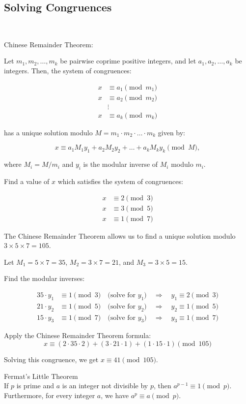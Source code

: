 \subsection{Solving Congruences}$ $\\
\begin{thm}{Chinese Remainder Theorem:}


Let $m_1, m_2, \ldots, m_k$ be pairwise coprime positive integers, and let $a_1, a_2, \ldots, a_k$ be integers. Then, the system of congruences:


\begin{align*}
x &\equiv a_1 \pmod{m_1} \\
x &\equiv a_2 \pmod{m_2} \\
& \vdots \\
x &\equiv a_k \pmod{m_k}
\end{align*}


has a unique solution modulo $M = m_1 \cdot m_2 \cdot \ldots \cdot m_k$ given by:

\[
x \equiv a_1 M_1 y_1 + a_2 M_2 y_2 + \ldots + a_k M_k y_k \pmod{M},
\]

where $M_i = M/m_i$ and $y_i$ is the modular inverse of $M_i$ modulo $m_i$.

\end{thm}
\begin{exmp}
Find a value of $x$ which satisfies the system of congruences:

\begin{align*}
x &\equiv 2 \pmod{3} \\
x &\equiv 3 \pmod{5} \\
x &\equiv 1 \pmod{7}
\end{align*}


The Chinese Remainder Theorem allows us to find a unique solution modulo \(3 \times 5 \times 7 = 105\).

Let \(M_1 = 5 \times 7 = 35\), \(M_2 = 3 \times 7 = 21\), and \(M_3 = 3 \times 5 = 15\).

Find the modular inverses:

\begin{align*}
35 \cdot y_1 &\equiv 1 \pmod{3} \quad \text{(solve for \(y_1\))} \quad \Rightarrow \quad y_1 \equiv 2 \pmod{3} \\
21 \cdot y_2 &\equiv 1 \pmod{5} \quad \text{(solve for \(y_2\))} \quad \Rightarrow \quad y_2 \equiv 1 \pmod{5} \\
15 \cdot y_3 &\equiv 1 \pmod{7} \quad \text{(solve for \(y_3\))} \quad \Rightarrow \quad y_3 \equiv 1 \pmod{7}
\end{align*}


Apply the Chinese Remainder Theorem formula:
\[ x \equiv (2 \cdot 35 \cdot 2) + (3 \cdot 21 \cdot 1) + (1 \cdot 15 \cdot 1) \pmod{105} \]

Solving this congruence, we get \(x \equiv 41 \pmod{105}\).
\end{exmp}
\begin{thm}{Fermat's Little Theorem}$ $\\

If $p$ is prime and $a$ is an integer not divisible by $p$, then $a^{p-1} \equiv 1 \pmod{p}$. Furthermore, for every integer $a$, we have $a^p \equiv a \pmod{p}$.

\end{thm}
\newpage


